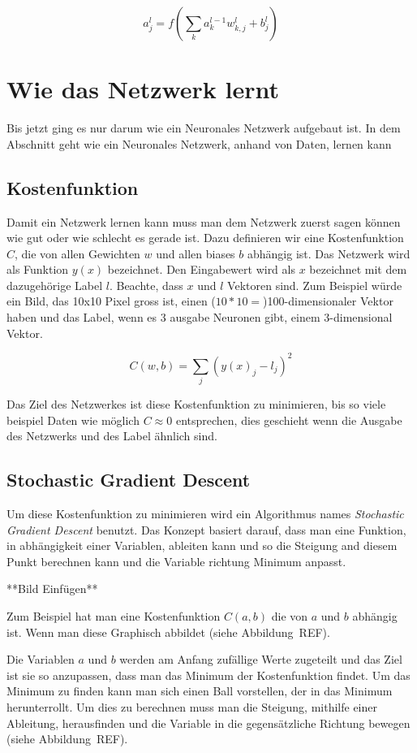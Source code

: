 \documentclass[12pt,a4paper]{report}
\begin{document}
\[a^l_j = f\left(\sum_{k} a^{l-1}_k w^l_{k,j} + b^l_j\right)\]

\section{Wie das Netzwerk lernt}\label{sec:lernen}
Bis jetzt ging es nur darum wie ein Neuronales Netzwerk aufgebaut ist.
In dem Abschnitt geht wie ein Neuronales Netzwerk, anhand von Daten, lernen kann
\subsection{Kostenfunktion}
Damit ein Netzwerk lernen kann muss man dem Netzwerk zuerst sagen können wie gut oder wie schlecht es gerade ist.
Dazu definieren wir eine Kostenfunktion $C$, die von allen Gewichten $w$ und allen biases $b$ abhängig ist.
Das Netzwerk wird als Funktion $y(x)$ bezeichnet.
Den Eingabewert wird als $x$ bezeichnet mit dem dazugehörige Label $l$.
Beachte, dass $x$ und $l$ Vektoren sind.
Zum Beispiel würde ein Bild, das 10x10 Pixel gross ist, einen ($10 * 10 =$)100-dimensionaler Vektor haben
und das Label, wenn es 3 ausgabe Neuronen gibt, einem 3-dimensional Vektor.

\[C(w,b) = \sum_{j}(y(x)_j - l_j)^2\]

Das Ziel des Netzwerkes ist diese Kostenfunktion zu minimieren, bis so viele beispiel Daten wie möglich $C \approx 0$ entsprechen,
dies geschieht wenn die Ausgabe des Netzwerks und des Label ähnlich sind.
\subsection{Stochastic Gradient Descent}
Um diese Kostenfunktion zu minimieren wird ein Algorithmus names \textit{Stochastic Gradient Descent} benutzt.
Das Konzept basiert darauf, dass man eine Funktion, in abhängigkeit einer Variablen, ableiten kann und so die Steigung
and diesem Punkt berechnen kann und die Variable richtung Minimum anpasst.

**Bild Einfügen**

Zum Beispiel hat man eine Kostenfunktion $C(a,b)$ die von $a$ und $b$ abhängig ist.
Wenn man diese Graphisch abbildet (siehe Abbildung~REF).

Die Variablen $a$ und $b$ werden am Anfang zufällige Werte zugeteilt und das Ziel ist sie so anzupassen,
dass man das Minimum der Kostenfunktion findet.
Um das Minimum zu finden kann man sich einen Ball vorstellen, der in das Minimum herunterrollt.
Um dies zu berechnen muss man die Steigung, mithilfe einer Ableitung, herausfinden und die Variable in die
gegensätzliche Richtung bewegen (siehe Abbildung~REF).
\end{document}
